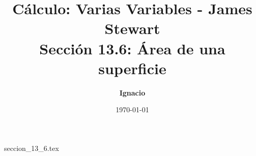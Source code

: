 \documentclass[11pt,spanish,oneside]{report}
\title{\textbf{Cálculo: Varias Variables - James Stewart} \\ \Large Sección 13.6: Área de una superficie}
\author{\textbf{Ignacio}}
\date{\today}
\begin{document}
\maketitle

{seccion_13_6.tex}
\end{document}
